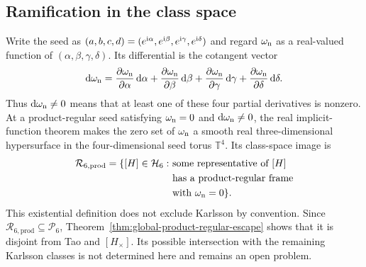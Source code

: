 \subsection{Ramification in the class space}
\label{subsec:intrinsic-loci-product-ramification}

Write the seed as $(a,b,c,d)=(e^{\mathrm i\alpha},e^{\mathrm i\beta},e^{\mathrm i\gamma},e^{\mathrm i\delta})$ and regard $\omega_{\rm n}$ as a real-valued function of $(\alpha,\beta,\gamma,\delta)$. Its differential is the cotangent vector
\begin{equation}
\mathrm d\omega_{\rm n}=\frac{\partial\omega_{\rm n}}{\partial\alpha}\,\mathrm d\alpha+\frac{\partial\omega_{\rm n}}{\partial\beta}\,\mathrm d\beta +\frac{\partial\omega_{\rm n}}{\partial\gamma}\,\mathrm d\gamma+\frac{\partial\omega_{\rm n}}{\partial\delta}\,\mathrm d\delta.
\label{eq:normalized-discriminant-differential-main}
\end{equation}
Thus $\mathrm d\omega_{\rm n}\neq0$ means that at least one of these four partial derivatives is nonzero. At a product-regular seed satisfying $\omega_{\rm n}=0$ and $\mathrm d\omega_{\rm n}\neq0$, the real implicit-function theorem makes the zero set of $\omega_{\rm n}$ a smooth real three-dimensional hypersurface in the four-dimensional seed torus $\mathbb{T}^4$. Its class-space image is
\begin{equation}
\begin{aligned}
\mathcal R_{6,\mathrm{prod}}=\{[H]\in\mathcal H_6:\ &\text{some representative of $[H]$}\\
&\text{has a product-regular frame}\\
&\text{with $\omega_{\rm n}=0$}\}.
\end{aligned}
\label{eq:product-ramification-locus}
\end{equation}
This existential definition does not exclude Karlsson by convention. Since $\mathcal R_{6,\mathrm{prod}}\subseteq\mathcal P_6$, Theorem~\ref{thm:global-product-regular-escape} shows that it is disjoint from Tao and $[H_\times]$. Its possible intersection with the remaining Karlsson classes is not determined here and remains an open problem.

